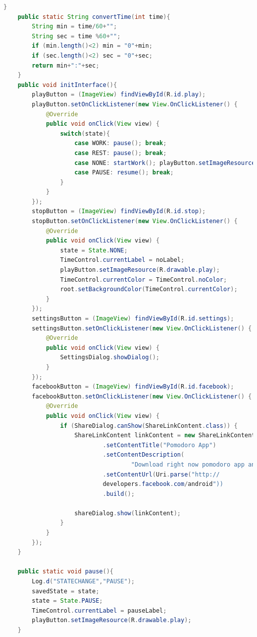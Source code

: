 \documentclass[12pt]{article}
\begin{document}
\begin{lstlisting}[language=java, caption={Fisierul PomodoroActivity.java}, label=list2]
    }
    public static String convertTime(int time){
        String min = time/60+"";
        String sec = time %60+"";
        if (min.length()<2) min = "0"+min;
        if (sec.length()<2) sec = "0"+sec;
        return min+":"+sec;
    }
    public void initInterface(){
        playButton = (ImageView) findViewById(R.id.play);
        playButton.setOnClickListener(new View.OnClickListener() {
            @Override
            public void onClick(View view) {
                switch(state){
                    case WORK: pause(); break;
                    case REST: pause(); break;
                    case NONE: startWork(); playButton.setImageResource(R.drawable.pause); break;
                    case PAUSE: resume(); break;
                }
            }
        });
        stopButton = (ImageView) findViewById(R.id.stop);
        stopButton.setOnClickListener(new View.OnClickListener() {
            @Override
            public void onClick(View view) {
                state = State.NONE;
                TimeControl.currentLabel = noLabel;
                playButton.setImageResource(R.drawable.play);
                TimeControl.currentColor = TimeControl.noColor;
                root.setBackgroundColor(TimeControl.currentColor);
            }
        });
        settingsButton = (ImageView) findViewById(R.id.settings);
        settingsButton.setOnClickListener(new View.OnClickListener() {
            @Override
            public void onClick(View view) {
                SettingsDialog.showDialog();
            }
        });
        facebookButton = (ImageView) findViewById(R.id.facebook);
        facebookButton.setOnClickListener(new View.OnClickListener() {
            @Override
            public void onClick(View view) {
                if (ShareDialog.canShow(ShareLinkContent.class)) {
                    ShareLinkContent linkContent = new ShareLinkContent.Builder()
                            .setContentTitle("Pomodoro App")
                            .setContentDescription(
                                    "Download right now pomodoro app and change your life!")
                            .setContentUrl(Uri.parse("http://
                            developers.facebook.com/android"))
                            .build();

                    shareDialog.show(linkContent);
                }
            }
        });
    }

    public static void pause(){
        Log.d("STATECHANGE","PAUSE");
        savedState = state;
        state = State.PAUSE;
        TimeControl.currentLabel = pauseLabel;
        playButton.setImageResource(R.drawable.play);
    }


\end{lstlisting}
\end{document}
